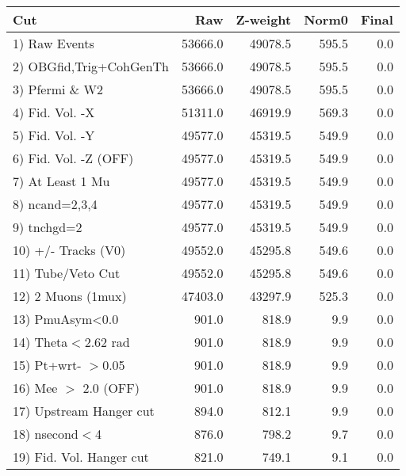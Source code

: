  \begin{table}[h!]\centering
 \begin{tabular}{||l||r|r|r|r||}
 \hline
 \hline
 Cut & Raw & Z-weight & Norm0 & Final \\
 \hline
  1) Raw Events           &     53666.0 &     49078.5 &       595.5 &         0.0 \\
  2) OBGfid,Trig+CohGenTh &     53666.0 &     49078.5 &       595.5 &         0.0 \\
  3) Pfermi \& W2         &     53666.0 &     49078.5 &       595.5 &         0.0 \\
  4) Fid. Vol. -X         &     51311.0 &     46919.9 &       569.3 &         0.0 \\
  5) Fid. Vol. -Y         &     49577.0 &     45319.5 &       549.9 &         0.0 \\
  6) Fid. Vol. -Z (OFF)   &     49577.0 &     45319.5 &       549.9 &         0.0 \\
  7) At Least 1 Mu        &     49577.0 &     45319.5 &       549.9 &         0.0 \\
  8) ncand=2,3,4          &     49577.0 &     45319.5 &       549.9 &         0.0 \\
  9) tnchgd=2             &     49577.0 &     45319.5 &       549.9 &         0.0 \\
 10) +/- Tracks (V0)      &     49552.0 &     45295.8 &       549.6 &         0.0 \\
 11) Tube/Veto Cut        &     49552.0 &     45295.8 &       549.6 &         0.0 \\
 12) 2 Muons (1mux)       &     47403.0 &     43297.9 &       525.3 &         0.0 \\
 13) PmuAsym<0.0          &       901.0 &       818.9 &         9.9 &         0.0 \\
 14) Theta$<$2.62 rad     &       901.0 &       818.9 &         9.9 &         0.0 \\
 15) Pt+wrt- $>$0.05      &       901.0 &       818.9 &         9.9 &         0.0 \\
 16) Mee $>$ 2.0  (OFF)   &       901.0 &       818.9 &         9.9 &         0.0 \\
 17) Upstream Hanger cut  &       894.0 &       812.1 &         9.9 &         0.0 \\
 18) nsecond$<$4          &       876.0 &       798.2 &         9.7 &         0.0 \\
 19) Fid. Vol. Hanger cut &       821.0 &       749.1 &         9.1 &         0.0 \\

\end{tabular}
\end{table}
